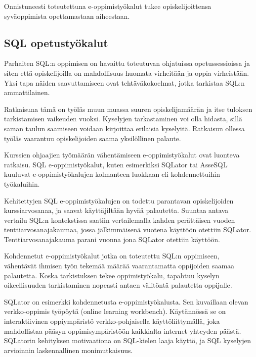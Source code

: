 \documentclass[finnish,twoside,openright]{HYgraduMLDS}
\begin{document}
Onnistuneesti toteutettuna e-oppimistyökalut tukee opiskelijoittensa syväoppimista opettamastaan aiheestaan\cite{sadiq2004sqlator}.


\subsection{SQL opetustyökalut}

Parhaiten SQL:n oppimisen on havaittu toteutuvan ohjatuissa opetussessioissa ja siten että opiskelijoilla on mahdollisuus huomata virheitään ja oppia virheistään\cite{sadiq2004sqlator}. Yksi tapa näiden saavuttamiseen ovat tehtäväkokoelmat, jotka tarkistaa SQL:n ammattilainen. 

Ratkaisuna tämä on työläs muun muassa suuren opiskelijamäärän ja itse tuloksen tarkistamisen vaikeuden vuoksi. Kyselyjen tarkastaminen voi olla hidasta, sillä saman taulun saamiseen voidaan kirjoittaa erilaisia kyselyitä. Ratkaisun ollessa työläs vaarantuu opiskelijoiden saama yksilöllinen palaute\cite{sadiq2004sqlator}.

Kurssien ohjaajien työmäärän vähentämiseen e-oppimistyökalut ovat luonteva ratkaisu. SQL e-oppimistyökalut, kuten esimerkiksi SQLator tai AsseSQL kuuluvat e-oppimistyökalujen kolmanteen luokkaan eli kohdennettuihin työkaluihin\cite{sadiq2004sqlator}.

Kehitettyjen SQL e-oppimistyökalujen on todettu parantavan opiskelijoiden kurssiarvosanaa, ja saavat käyttäjiltään hyvää palautetta\cite{Brusilovsky:2010:LSP:1656255.1656257}. Suuntaa antava vertailu SQL:n kontekstissa saatiin vertailemalla kahden perättäisen vuoden tenttiarvosanajakaumaa, jossa jälkimmäisenä vuotena käyttöön otettiin SQLator\cite{sadiq2004sqlator}. Tenttiarvosanajakauma parani vuonna jona SQLator otettiin käyttöön.

Kohdennetut e-oppimistyökalut jotka on toteutettu SQL:n oppimiseen, vähentävät ihmisen työn tekemää määrää vaarantamatta oppijoiden saamaa palautetta. Koska tarkistuksen tekee oppimistyökalu, tapahtuu kyselyn oikeellisuuden tarkistaminen nopeasti antaen välitöntä palautetta oppijalle. 

SQLator on esimerkki kohdennetusta e-oppimistyökalusta\cite{sadiq2004sqlator}. Sen kuvaillaan olevan verkko-oppimis työpöytä (online learning workbench). Käytännössä se on interaktiivinen oppiympäristö verkko-pohjaisella käyttöliittymällä, joka mahdollistaa pääsyn oppimisympäristöön kaikkialta internet-yhteyden päästä. SQLatorin kehityksen motivaationa on SQL-kielen laaja käyttö, ja SQL kyselyjen arvioinnin laskennallinen monimutkaisuus. 
\end{document}
